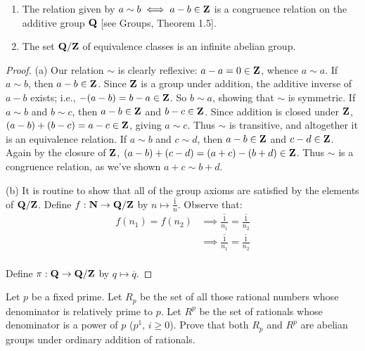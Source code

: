    \begin{exercise}
        \phantom{a}
        \begin{enumerate}[label = (\alph*),itemsep=1pt,topsep=3pt]
            \item The relation given by $a \sim b \iff a-b \in \mathbf{Z}$ is a congruence relation on the additive group $\mathbf{Q}$ [see Groups, Theorem 1.5].
            \item The set $\mathbf{Q}/\mathbf{Z}$ of equivalence classes is an infinite abelian group.
        \end{enumerate}
    \end{exercise}
        {\color{blue} \begin{proof}
            (a) Our relation $\sim$ is clearly reflexive: $a-a = 0 \in \mathbf{Z}$, whence $a \sim a$. If $a \sim b$, then $a-b \in \mathbf{Z}$. Since $\mathbf{Z}$ is a group under addition, the additive inverse of $a-b$ exists; i.e., $-(a-b) = b-a \in \mathbf{Z}$. So $b \sim a$, showing that $\sim$ is symmetric. If $a \sim b$ and $b \sim c$, then $a-b \in \mathbf{Z}$ and $b - c \in \mathbf{Z}$. Since addition is closed under $\mathbf{Z}$, $(a-b) + (b-c) = a - c \in \mathbf{Z}$, giving $a \sim c$. Thus $\sim$ is transitive, and altogether it is an equivalence relation. If $a \sim b$ and $c \sim d$, then $a - b \in \mathbf{Z}$ and $c - d \in \mathbf{Z}$. Again by the closure of $\mathbf{Z}$, $(a-b) + (c-d) = (a+c) - (b+d) \in \mathbf{Z}$. Thus $\sim$ is a congruence relation, as we've shown $a + c \sim b + d$.

            (b) It is routine to show that all of the group axioms are satisfied by the elements of $\mathbf{Q}/\mathbf{Z}$. Define $f:\mathbf{N} \rightarrow \mathbf{Q}/\mathbf{Z}$ by $n \mapsto \overline{\frac{1}{n}}$. Observe that:
                \begin{equation*}
                \begin{split}
                    f(n_1) = f(n_2) 
                    & \implies \overline{\frac{1}{n_1}} = \overline{\frac{1}{n_2}} \\
                    & \implies \overline{\frac{1}{n_1}} = \overline{\frac{1}{n_2}} \\
                \end{split}
                \end{equation*} 

            Define $\pi: \mathbf{Q} \rightarrow \mathbf{Q}/\mathbf{Z}$ by $q \mapsto \overline{q}$.
        \end{proof}}
    
    \begin{exercise}
        Let $p$ be a fixed prime. Let $R_p$ be the set of all those rational numbers whose denominator is relatively prime to $p$. Let $R^p$ be the set of rationals whose denominator is a power of $p$ ($p^1$, $i \geq 0$). Prove that both $R_p$ and $R^p$ are abelian groups under ordinary addition of rationals.
    \end{exercise}
    
